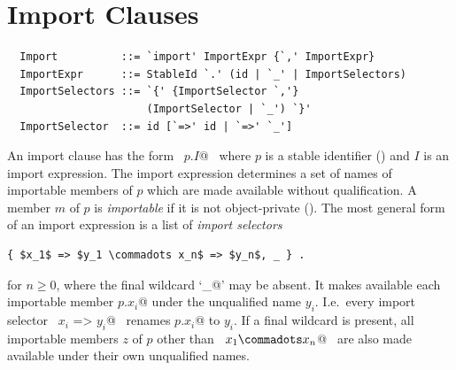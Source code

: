 
\section{Import Clauses}
\label{sec:import}

\syntax\begin{lstlisting}
  Import          ::= `import' ImportExpr {`,' ImportExpr}
  ImportExpr      ::= StableId `.' (id | `_' | ImportSelectors)
  ImportSelectors ::= `{' {ImportSelector `,'} 
                      (ImportSelector | `_') `}'
  ImportSelector  ::= id [`=>' id | `=>' `_']
\end{lstlisting}

An import clause has the form ~\lstinline@import $p$.$I$@~ where $p$ is a stable
identifier () and $I$ is an import expression.
The import expression determines a set of names of importable members of $p$
which are made available without qualification.  A member $m$ of $p$ is
{\em importable} if it is not object-private ().
The most general form of an import expression is a list of {\em import
selectors}
\begin{lstlisting}
{ $x_1$ => $y_1 \commadots x_n$ => $y_n$, _ } .
\end{lstlisting}
for $n \geq 0$, where the final wildcard `\lstinline@_@' may be absent.  It
makes available each importable member \lstinline@$p$.$x_i$@ under the unqualified name
$y_i$. I.e.\ every import selector ~\lstinline@$x_i$ => $y_i$@~ renames
\lstinline@$p$.$x_i$@ to
$y_i$.  If a final wildcard is present, all importable members $z$ of
$p$ other than ~\lstinline@$x_1 \commadots x_n$@~ are also made available
under their own unqualified names.

